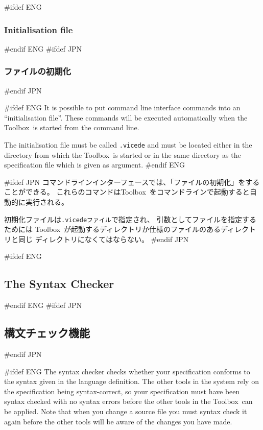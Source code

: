 \documentclass[\pformat,12pt]{article}
\newcommand{\Toolbox}{Toolbox}
\newcommand{\vdmde}{vdmde}
\newcommand{\Toolbox}{Toolbox}
\newcommand{\vdmde}{vppde}
\renewcommand{\vdmde}{vicede}
\begin{document}
#ifdef ENG
\subsubsection{Initialisation file} 
#endif ENG
#ifdef JPN
\subsubsection{ファイルの初期化}
#endif JPN

#ifdef ENG
It is possible to put command line interface commands into an
``initialisation file''. These commands will be executed automatically 
when the \Toolbox\ is started from the command line.

The initialisation file must be called {\tt .\vdmde}\index{.\vdmde\ file} 
and must be located either in the directory from which the
\Toolbox\ is started or in the same directory as the specification
file which is given as argument.
#endif ENG

#ifdef JPN
コマンドラインインターフェースでは、「ファイルの初期化」をすることができる。
これらのコマンドは\Toolbox\ をコマンドラインで起動すると自動的に実行される。

初期化ファイルは{\tt .\vdmde ファイル}\index{.\vdmde ファイル}で指定され、
引数としてファイルを指定するためには
\Toolbox\ が起動するディレクトリか仕様のファイルのあるディレクトリと同じ
ディレクトリになくてはならない。
#endif JPN

\newpage
#ifdef ENG
\subsection{The Syntax Checker}\label{sec:parser}
#endif ENG
#ifdef JPN
\subsection{構文チェック機能}\label{sec:parser}
#endif JPN

#ifdef ENG
The syntax checker checks whether your specification conforms to the
syntax given in the language definition. The other tools in the system
rely on the specification being syntax-correct, so your
specification must have been syntax checked with no syntax errors
before the other tools in the \Toolbox\ can be applied. Note that when you
change a source file you must syntax check it again before the other
tools will be aware of the changes you have made.
\end{document}
